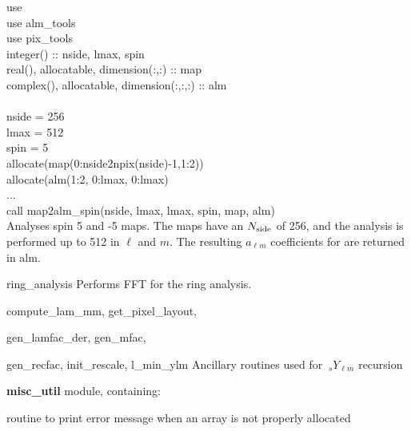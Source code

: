 \begin{example}
{
use \\
use alm\_tools\\
use pix\_tools\\
integer() :: nside, lmax, spin \\
real(), allocatable, dimension(:,:) :: map \\
complex(), allocatable, dimension(:,:,:) :: alm \\
\\
nside = 256 \\
lmax = 512 \\
spin = 5 \\
allocate(map(0:nside2npix(nside)-1,1:2)) \\
allocate(alm(1:2, 0:lmax, 0:lmax)\\
...\\
call map2alm\_spin(nside, lmax, lmax, spin, map, alm)  \\
}
{
Analyses spin 5 and -5 maps. The maps have
an $N_{\mathrm{side}}$ of 256, and the analysis is performed up
to 512 in $\ell$ and $m$. The resulting $a_{\ell m}$ coefficients for
are returned in alm.
}
\end{example}

\begin{modules}
  \begin{sulist}{} %
  \item[ring\_analysis] Performs FFT for the ring analysis.
  \item[compute\_lam\_mm, get\_pixel\_layout, ]
  \item[gen\_lamfac\_der, gen\_mfac,  ] 
  \item[gen\_recfac, init\_rescale, l\_min\_ylm] Ancillary routines used
  for $\ {_s}Y_{\ell m}$ recursion
  \item[\textbf{misc\_util}] module, containing:
  \item[\htmlref{assert\_alloc}{sub:assert}] routine to print error message when an array is not
  properly allocated		
  \end{sulist}
\end{modules}

